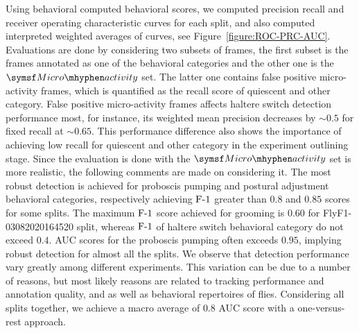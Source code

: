 Using behavioral computed behavioral scores, we computed precision recall and receiver operating characteristic curves for each split, and also computed interpreted weighted averages of curves, see Figure~\ref{figure:ROC-PRC-AUC}.
Evaluations are done by considering two subsets of frames, the first subset is the frames annotated as one of the behavioral categories and the other one is the $\MicroActivity$ set.
The latter one contains false positive micro-activity frames, which is quantified as the recall score of quiescent and other category.
False positive micro-activity frames affects haltere switch detection performance most, for instance, its weighted mean precision decreases by ${\sim}0.5$ for fixed recall at ${\sim}0.65$.
This performance difference also shows the importance of achieving low recall for quiescent and other category in the experiment outlining stage.
Since the evaluation is done with the $\MicroActivity$ set is more realistic, the following comments are made on considering it.
The most robust detection is achieved for proboscis pumping and postural adjustment behavioral categories, respectively achieving $\textnormal{F-}1$ greater than $0.8$ and $0.85$ scores for some splits.
The maximum $\textnormal{F-}1$ score achieved for grooming is $0.60$ for FlyF1-03082020164520 split, whereas $\textnormal{F-}1$ of haltere switch behavioral category do not exceed $0.4$.
AUC scores for the proboscis pumping often exceeds $0.95$, implying robust detection for almost all the splits.
We observe that detection performance vary greatly among different experiments. This variation can be due to a number of reasons, but most likely reasons are related to tracking performance and annotation quality, and as well as behavioral repertoires of flies.
Considering all splits together, we achieve a macro average of $0.8$ AUC score with a one-versus-rest approach.


